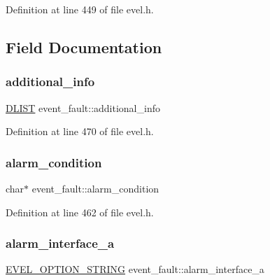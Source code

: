 Definition at line 449 of file evel.\+h.



\subsection{Field Documentation}
\hypertarget{structevent__fault_a68765630c9cb8e88a482778e0bab551d}{}\label{structevent__fault_a68765630c9cb8e88a482778e0bab551d} 
\subsubsection{\texorpdfstring{additional\+\_\+info}{additional\_info}}
{\footnotesize\ttfamily \hyperlink{double__list_8h_a45f4a129042d9e1aa4ffd31fe13e4d14}{D\+L\+I\+ST} event\+\_\+fault\+::additional\+\_\+info}



Definition at line 470 of file evel.\+h.

\hypertarget{structevent__fault_ad8cee6bd12f2cd91f2c6e5b26b6fe99a}{}\label{structevent__fault_ad8cee6bd12f2cd91f2c6e5b26b6fe99a} 
\subsubsection{\texorpdfstring{alarm\+\_\+condition}{alarm\_condition}}
{\footnotesize\ttfamily char$\ast$ event\+\_\+fault\+::alarm\+\_\+condition}



Definition at line 462 of file evel.\+h.

\hypertarget{structevent__fault_ab5fda001f74795dda5a6c09caabd7ffe}{}\label{structevent__fault_ab5fda001f74795dda5a6c09caabd7ffe} 
\subsubsection{\texorpdfstring{alarm\+\_\+interface\+\_\+a}{alarm\_interface\_a}}
{\footnotesize\ttfamily \hyperlink{evel_8h_a0de5113a7b72de93c0c7b644f7ea7ec3}{E\+V\+E\+L\+\_\+\+O\+P\+T\+I\+O\+N\+\_\+\+S\+T\+R\+I\+NG} event\+\_\+fault\+::alarm\+\_\+interface\+\_\+a}



